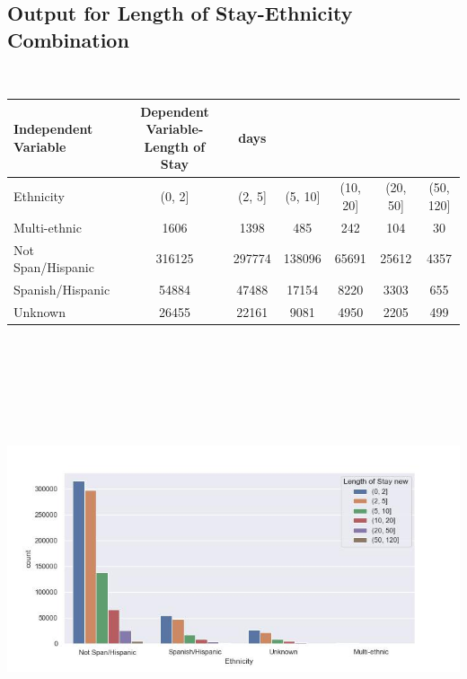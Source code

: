 \documentclass[
	letterpaper, %
]{jdf}
\begin{document}
\subsection{Output for Length of Stay-Ethnicity Combination}
\ 
\begin{jdftable}
\label{table:Example}
\small %
\begin{tabular}{@{} l c c c c c c}
\textbf{Independent Variable} & \textbf{Dependent Variable-Length of Stay} &\textbf{days} & & & \\
	\toprule[0.5pt]
Ethnicity & (0, 2] & (2, 5] & (5, 10] & (10, 20] & (20, 50] & (50, 120] \\
\midrule
Multi-ethnic & 1606 & 1398 & 485 & 242 & 104 & 30 \\
\midrule
Not Span/Hispanic & 316125 & 297774 & 138096 & 65691 & 25612 & 4357 \\
\midrule
Spanish/Hispanic & 54884 & 47488 & 17154 & 8220 & 3303 & 655 \\
\midrule
Unknown & 26455 & 22161 & 9081 & 4950 & 2205 & 499 \\
\end{tabular}
\end{jdftable}
\begin{jdffigure}
\includegraphics[height=13cm]{Figures/length-Ethnicity.jpg} \\
\label{fig:length-Ethnicity}%
\end{jdffigure}
\end{document}
